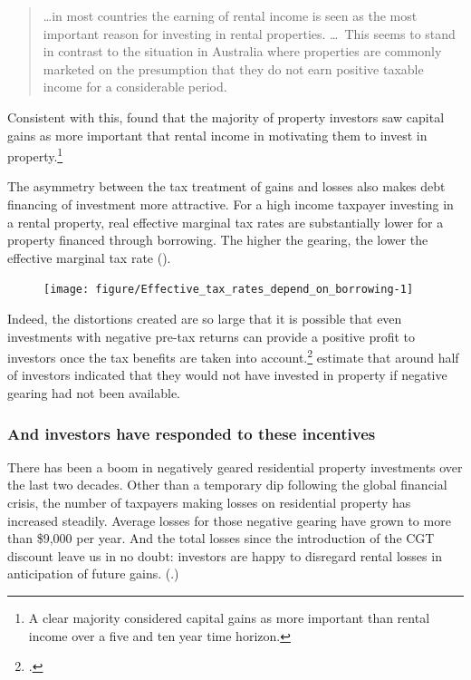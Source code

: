 \documentclass{grattan}\usepackage[]{graphicx}\usepackage[]{color}
\begin{document}
\begin{quote}
\!\dots in most countries the earning of rental income is seen as the most important reason for investing in rental properties. \dots\ This seems to stand in contrast to the situation in Australia where properties are commonly marketed on the presumption that they do not earn positive taxable income for a considerable period.
\end{quote}

Consistent with this, \textcite{seelig2009understanding} found that the majority of property investors saw capital gains as more important that rental income in motivating them to invest in property.\footnote{A clear majority considered capital gains as more important than rental income over a five and ten year time horizon.}

The asymmetry between the tax treatment of gains and losses also makes debt financing of investment more attractive. For a high income taxpayer investing in a rental property, real effective marginal tax rates are substantially lower for a property financed through borrowing. The higher the gearing, the lower the effective marginal tax rate (). 


\begin{figure}[t]
\texttt{[image: figure/Effective\_tax\_rates\_depend\_on\_borrowing-1]}

\end{figure}
Indeed, the distortions created are so large that it is possible that even investments with negative pre-tax returns can provide a positive profit to investors once the tax benefits are taken into account.\footcite[p.~78]{Burman1999}  \textcite{seelig2009understanding} estimate that around half of investors indicated that they would not have invested in property if negative gearing had not been available.

\subsubsection{And investors have responded to these incentives}
There has been a boom in negatively geared residential property investments over the last two decades. Other than a temporary dip following the global financial crisis, the number of taxpayers making losses on residential property has increased steadily. Average losses for those negative gearing have grown to more than \$9,000 per year. And the total losses since the introduction of the CGT discount leave us in no doubt: investors are happy to disregard rental losses in anticipation of future gains. (.)
\end{document}
